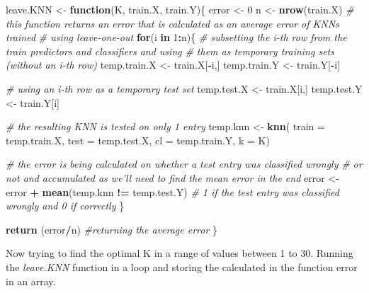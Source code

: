 \documentclass[
]{article}
\newenvironment{Shaded}{\begin{snugshade}}{\end{snugshade}}
\newcommand{\CommentTok}[1]{\textcolor[rgb]{0.56,0.35,0.01}{\textit{#1}}}
\newcommand{\ControlFlowTok}[1]{\textcolor[rgb]{0.13,0.29,0.53}{\textbf{#1}}}
\newcommand{\DataTypeTok}[1]{\textcolor[rgb]{0.13,0.29,0.53}{#1}}
\newcommand{\DecValTok}[1]{\textcolor[rgb]{0.00,0.00,0.81}{#1}}
\newcommand{\KeywordTok}[1]{\textcolor[rgb]{0.13,0.29,0.53}{\textbf{#1}}}
\newcommand{\NormalTok}[1]{#1}
\newcommand{\OperatorTok}[1]{\textcolor[rgb]{0.81,0.36,0.00}{\textbf{#1}}}
\newcommand{\StringTok}[1]{\textcolor[rgb]{0.31,0.60,0.02}{#1}}
\begin{document}
\begin{Shaded}
\begin{Highlighting}[]
\NormalTok{leave.KNN <-}\StringTok{ }\ControlFlowTok{function}\NormalTok{(K, train.X, train.Y)\{}
\NormalTok{  error <-}\StringTok{ }\DecValTok{0}
\NormalTok{  n <-}\StringTok{ }\KeywordTok{nrow}\NormalTok{(train.X)}
  \CommentTok{# this function returns an error that is calculated as an average error of KNNs trained }
  \CommentTok{# using leave-one-out}
        \ControlFlowTok{for}\NormalTok{(i }\ControlFlowTok{in} \DecValTok{1}\OperatorTok{:}\NormalTok{n)\{}
          \CommentTok{# subsetting the i-th row from the train predictors and classifiers and using}
          \CommentTok{# them as temporary training sets (without an i-th row)}
\NormalTok{          temp.train.X <-}\StringTok{ }\NormalTok{train.X[}\OperatorTok{-}\NormalTok{i,]}
\NormalTok{          temp.train.Y <-}\StringTok{ }\NormalTok{train.Y[}\OperatorTok{-}\NormalTok{i]}

          \CommentTok{# using an i-th row as a temporary test set}
\NormalTok{          temp.test.X <-}\StringTok{ }\NormalTok{train.X[i,]}
\NormalTok{          temp.test.Y <-}\StringTok{ }\NormalTok{train.Y[i]}

          \CommentTok{# the resulting KNN is tested on only 1 entry}
\NormalTok{          temp.knn <-}\StringTok{ }\KeywordTok{knn}\NormalTok{(}
            \DataTypeTok{train =}\NormalTok{ temp.train.X, }
            \DataTypeTok{test =}\NormalTok{ temp.test.X, }
            \DataTypeTok{cl =}\NormalTok{ temp.train.Y, }\DataTypeTok{k =}\NormalTok{ K)}

          \CommentTok{# the error is being calculated on whether a test entry was classified wrongly }
          \CommentTok{# or not and accumulated as we'll need to find the mean error in the end}
\NormalTok{          error <-}\StringTok{ }\NormalTok{error }\OperatorTok{+}\StringTok{ }\KeywordTok{mean}\NormalTok{(temp.knn }\OperatorTok{!=}\StringTok{ }\NormalTok{temp.test.Y) }
            \CommentTok{# 1 if the test entry was classified wrongly and 0 if correctly}
\NormalTok{        \}}

     \KeywordTok{return}\NormalTok{ (error}\OperatorTok{/}\NormalTok{n) }\CommentTok{#returning the average error}
\NormalTok{\}}
\end{Highlighting}
\end{Shaded}

Now trying to find the optimal K in a range of values between 1 to 30.
Running the \emph{leave.KNN} function in a loop and storing the
calculated in the function error in an array.
\end{document}
